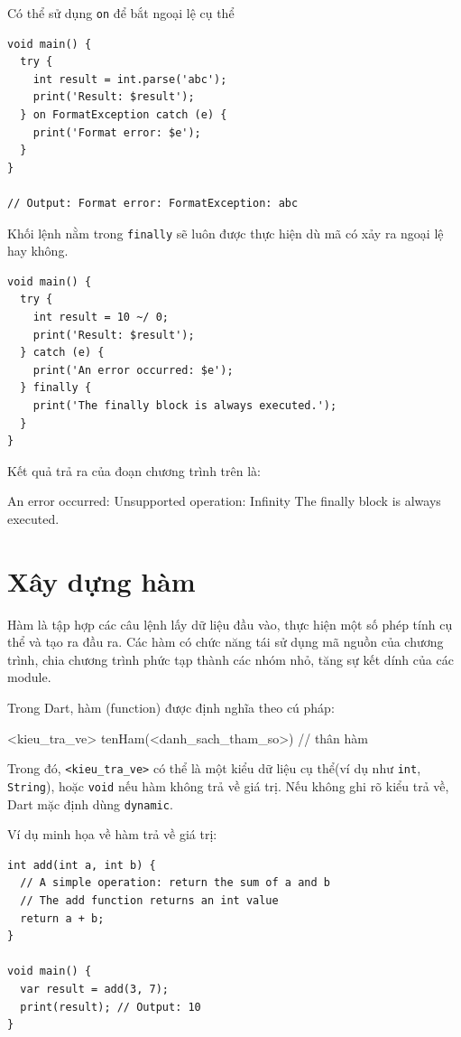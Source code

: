 \documentclass[../DoAn.tex]{subfiles}
\numberwithin{figure}{chapter}
\begin{document}
Có thể sử dụng \texttt{on} để bắt ngoại lệ cụ thể
\begin{lstlisting}
void main() {
  try {
    int result = int.parse('abc');
    print('Result: $result');
  } on FormatException catch (e) {
    print('Format error: $e');
  }
}

// Output: Format error: FormatException: abc
\end{lstlisting}

Khối lệnh nằm trong \texttt{finally} sẽ luôn được thực hiện dù mã có xảy ra ngoại lệ hay không.
\begin{lstlisting}
void main() {
  try {
    int result = 10 ~/ 0;
    print('Result: $result');
  } catch (e) {
    print('An error occurred: $e');
  } finally {
    print('The finally block is always executed.');
  }
}
\end{lstlisting}

Kết quả trả ra của đoạn chương trình trên là: 
\begin{myverbatim}
An error occurred: Unsupported operation: Infinity
The finally block is always executed.
\end{myverbatim}

\section{Xây dựng hàm}
Hàm là tập hợp các câu lệnh lấy dữ liệu đầu vào, thực hiện một số phép tính cụ thể và tạo ra đầu ra. Các hàm có chức năng tái sử dụng mã nguồn của chương trình, chia chương trình phức tạp thành các nhóm nhỏ, tăng sự kết dính của các module.

Trong Dart, hàm (function) được định nghĩa theo cú pháp:
\begin{myverbatim}
<kieu_tra_ve> tenHam(<danh_sach_tham_so>) {
    // thân hàm
}
\end{myverbatim}

Trong đó, \texttt{<kieu\_tra\_ve>} có thể là một kiểu dữ liệu cụ thể(ví dụ như \texttt{int}, \texttt{String}), hoặc \texttt{void} nếu hàm không trả về giá trị. Nếu không ghi rõ kiểu trả về, Dart mặc định dùng \texttt{dynamic}.

Ví dụ minh họa về hàm trả về giá trị:
\begin{lstlisting}
int add(int a, int b) {
  // A simple operation: return the sum of a and b
  // The add function returns an int value
  return a + b;
}

void main() {
  var result = add(3, 7);
  print(result); // Output: 10
}
\end{lstlisting}
\end{document}
